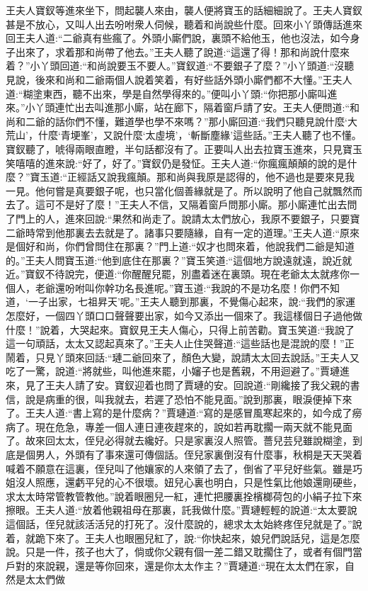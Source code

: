 \begin{parag}
    王夫人寶釵等進來坐下，問起襲人來由，襲人便將寶玉的話細細說了。王夫人寶釵甚是不放心，又叫人出去吩咐衆人伺候，聽着和尚說些什麼。回來小丫頭傳話進來回王夫人道:“二爺真有些瘋了。外頭小廝們說，裏頭不給他玉，他也沒法，如今身子出來了，求着那和尚帶了他去。”王夫人聽了說道:“這還了得！那和尚說什麼來着？”小丫頭回道:“和尚說要玉不要人。”寶釵道:“不要銀子了麼？”小丫頭道:“沒聽見說，後來和尚和二爺兩個人說着笑着，有好些話外頭小廝們都不大懂。”王夫人道:“糊塗東西，聽不出來，學是自然學得來的。”便叫小丫頭:“你把那小廝叫進來。”小丫頭連忙出去叫進那小廝，站在廊下，隔着窗戶請了安。王夫人便問道:“和尚和二爺的話你們不懂，難道學也學不來嗎？”那小廝回道:“我們只聽見說什麼‘大荒山’，什麼‘青埂峯’，又說什麼‘太虛境’，‘斬斷塵緣’這些話。”王夫人聽了也不懂。寶釵聽了，唬得兩眼直瞪，半句話都沒有了。正要叫人出去拉寶玉進來，只見寶玉笑嘻嘻的進來說:“好了，好了。”寶釵仍是發怔。王夫人道:“你瘋瘋顛顛的說的是什麼？”寶玉道:“正經話又說我瘋顛。那和尚與我原是認得的，他不過也是要來見我一見。他何嘗是真要銀子呢，也只當化個善緣就是了。所以說明了他自己就飄然而去了。這可不是好了麼！”王夫人不信，又隔着窗戶問那小廝。那小廝連忙出去問了門上的人，進來回說:“果然和尚走了。說請太太們放心，我原不要銀子，只要寶二爺時常到他那裏去去就是了。諸事只要隨緣，自有一定的道理。”王夫人道:“原來是個好和尚，你們曾問住在那裏？”門上道:“奴才也問來着，他說我們二爺是知道的。”王夫人問寶玉道:“他到底住在那裏？”寶玉笑道:“這個地方說遠就遠，說近就近。”寶釵不待說完，便道:“你醒醒兒罷，別盡着迷在裏頭。現在老爺太太就疼你一個人，老爺還吩咐叫你幹功名長進呢。”寶玉道:“我說的不是功名麼！你們不知道，‘一子出家，七祖昇天’呢。”王夫人聽到那裏，不覺傷心起來，說:“我們的家運怎麼好，一個四丫頭口口聲聲要出家，如今又添出一個來了。我這樣個日子過他做什麼！”說着，大哭起來。寶釵見王夫人傷心，只得上前苦勸。寶玉笑道:“我說了這一句頑話，太太又認起真來了。”王夫人止住哭聲道:“這些話也是混說的麼！”正鬧着，只見丫頭來回話:“璉二爺回來了，顏色大變，說請太太回去說話。”王夫人又吃了一驚，說道:“將就些，叫他進來罷，小嬸子也是舊親，不用迴避了。”賈璉進來，見了王夫人請了安。寶釵迎着也問了賈璉的安。回說道:“剛纔接了我父親的書信，說是病重的很，叫我就去，若遲了恐怕不能見面。”說到那裏，眼淚便掉下來了。王夫人道:“書上寫的是什麼病？”賈璉道:“寫的是感冒風寒起來的，如今成了癆病了。現在危急，專差一個人連日連夜趕來的，說如若再耽擱一兩天就不能見面了。故來回太太，侄兒必得就去纔好。只是家裏沒人照管。薔兒芸兒雖說糊塗，到底是個男人，外頭有了事來還可傳個話。侄兒家裏倒沒有什麼事，秋桐是天天哭着喊着不願意在這裏，侄兒叫了他孃家的人來領了去了，倒省了平兒好些氣。雖是巧姐沒人照應，還虧平兒的心不很壞。妞兒心裏也明白，只是性氣比他娘還剛硬些，求太太時常管教管教他。”說着眼圈兒一紅，連忙把腰裏拴檳榔荷包的小絹子拉下來擦眼。王夫人道:“放着他親祖母在那裏，託我做什麼。”賈璉輕輕的說道:“太太要說這個話，侄兒就該活活兒的打死了。沒什麼說的，總求太太始終疼侄兒就是了。”說着，就跪下來了。王夫人也眼圈兒紅了，說:“你快起來，娘兒們說話兒，這是怎麼說。只是一件，孩子也大了，倘或你父親有個一差二錯又耽擱住了，或者有個門當戶對的來說親，還是等你回來，還是你太太作主？”賈璉道:“現在太太們在家，自然是太太們做
\end{parag}
